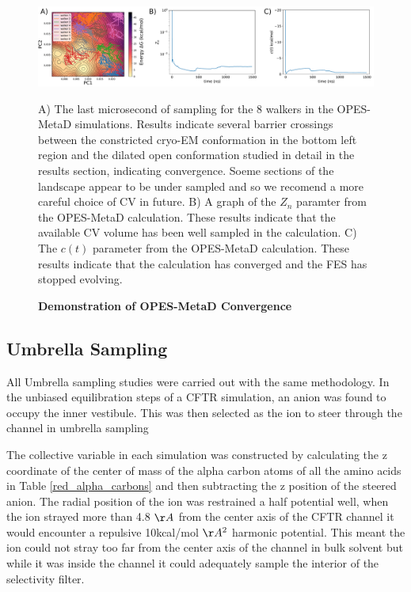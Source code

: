 \begin{figure}
	\begin{center}
		\includegraphics[width=1\textwidth]{figures/opening/FES_mw_trace.pdf}
	\end{center}
	\captionsetup{singlelinecheck = false, justification=raggedright}
	\caption[Demonstration of OPES-MetaD Convergence ] {\textbf{Demonstration of OPES-MetaD Convergence}}{A) The last microsecond of sampling for the 8 walkers in the OPES-MetaD simulations. Results indicate several barrier crossings between the constricted cryo-EM conformation in the bottom left region and the dilated open conformation studied in detail in the results section, indicating convergence. Soeme sections of the landscape appear to be under sampled and so we recomend a more careful choice of CV in future. B) A graph of the $Z_n$ paramter from the OPES-MetaD calculation. These results indicate that the available CV volume has been well sampled in the calculation. C) The $c(t)$ parameter from the OPES-MetaD calculation. These results indicate that the calculation has converged and the FES has stopped evolving. }
	\label{convergence_3}
\end{figure}

\subsection{Umbrella Sampling}
All Umbrella sampling studies were carried out with the same methodology. In the unbiased equilibration steps of a CFTR simulation, an anion was found to occupy the inner vestibule. This was then selected as the ion to steer through the channel in umbrella sampling

The collective variable in each simulation was constructed by calculating the z coordinate of the center of mass of the alpha carbon atoms of all the amino acids in Table \ref{red_alpha_carbons} and then subtracting the z position of the steered anion. The radial position of the ion was restrained a half potential well, when the ion strayed more than 4.8 $\AA$ from the center axis of the CFTR channel it would encounter a repulsive 10kcal/mol $\AA^2$ harmonic potential. This meant the ion could not stray too far from the center axis of the channel in bulk solvent but while it was inside the channel it could adequately sample the interior of the selectivity filter.

